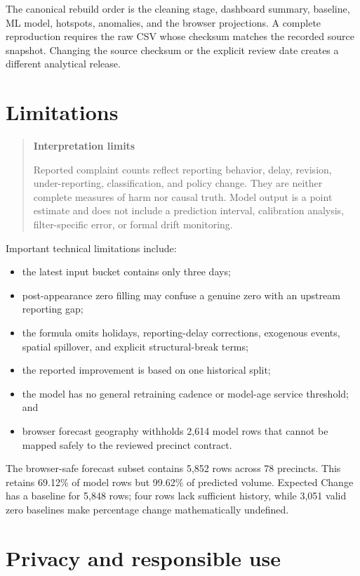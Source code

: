 \documentclass[11pt,oneside]{report}
\newenvironment{warningbox}[1][]
  {\begin{quote}\small\noindent\textbf{#1}\par\smallskip}
  {\end{quote}}
\begin{document}
The canonical rebuild order is the cleaning stage, dashboard summary, baseline,
ML model, hotspots, anomalies, and the browser projections. A complete
reproduction requires the raw CSV whose checksum matches the recorded source
snapshot. Changing the source checksum or the explicit review date creates a
different analytical release.

\section{Limitations}

\begin{warningbox}[Interpretation limits]
Reported complaint counts reflect reporting behavior, delay, revision,
under-reporting, classification, and policy change. They are neither complete
measures of harm nor causal truth. Model output is a point estimate and does not
include a prediction interval, calibration analysis, filter-specific error, or
formal drift monitoring.
\end{warningbox}

Important technical limitations include:

\begin{itemize}
  \item the latest input bucket contains only three days;
  \item post-appearance zero filling may confuse a genuine zero with an
    upstream reporting gap;
  \item the formula omits holidays, reporting-delay corrections, exogenous
    events, spatial spillover, and explicit structural-break terms;
  \item the reported improvement is based on one historical split;
  \item the model has no general retraining cadence or model-age service
    threshold; and
  \item browser forecast geography withholds 2,614 model rows that cannot be
    mapped safely to the reviewed precinct contract.
\end{itemize}

The browser-safe forecast subset contains 5,852 rows across 78 precincts. This
retains 69.12\% of model rows but 99.62\% of predicted volume. Expected Change
has a baseline for 5,848 rows; four rows lack sufficient history, while 3,051
valid zero baselines make percentage change mathematically undefined.

\section{Privacy and responsible use}
\end{document}
